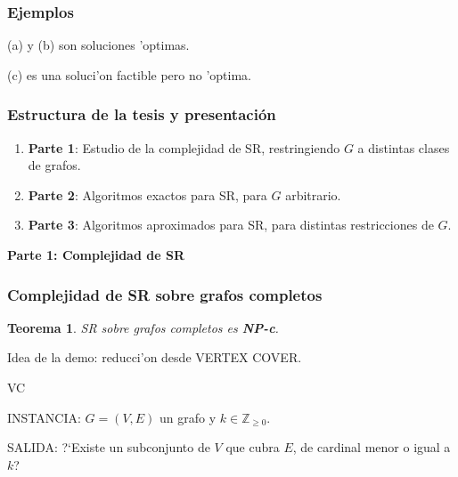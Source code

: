 \documentclass{beamer}
\newcommand{\class}[1]{\textnormal{\textbf{#1}}}
\newcommand{\probl}[1]{\textnormal{\textsf{#1}}}
\newtheorem*{thm}{Teorema}
\newcommand{\decpr}[3]{
\begin{list}{}{
\setlength{\leftmargin}{0.1in}
\setlength{\rightmargin}{0.1in}
\setlength{\parsep}{0pt}
\setlength{\itemsep}{2pt}
\setlength{\topsep}{\itemsep}
\setlength{\partopsep}{\itemsep}
}
\item
{\probl{#1}}
\item
{INSTANCIA: #2}
\item
{SALIDA: #3}
\end{list}
\vspace{1mm}
}
\begin{document}
\begin{frame}
\frametitle{Ejemplos}
\vspace{5mm}
\begin{figure}
	\begin{center}
		
	\end{center}	
\end{figure}
(a) y (b) son soluciones 'optimas.

(c) es una soluci'on factible pero no 'optima.
\end{frame}

\begin{frame}
\frametitle{Estructura de la tesis y presentaci\'on}

\pause

\begin{enumerate}
\item[] \textbf{Parte 1}: Estudio de la complejidad de \probl{SR}, restringiendo $G$ a distintas clases de grafos.
\vspace{2mm}
\pause
\item[] \textbf{Parte 2}: Algoritmos exactos para \probl{SR}, para $G$ arbitrario.
\vspace{2mm}
\pause
\item[] \textbf{Parte 3}: Algoritmos aproximados para \probl{SR}, para distintas restricciones de $G$.
\end{enumerate}
\end{frame}

\begin{frame}
\begin{center}
\begin{Large}
\textbf{Parte 1: Complejidad de \probl{SR}}
\end{Large}
\end{center}
\end{frame}

\begin{frame}
\frametitle{Complejidad de \probl{SR} sobre grafos completos}

\pause

\begin{thm}
\probl{SR} sobre grafos completos es \class{NP-c}.
\end{thm}

\pause
\vspace{3mm}

Idea de la demo: reducci'on desde \probl{VERTEX COVER}.\\

\pause
\vspace{3mm}

\decpr{VC}{$G = (V, E)$ un grafo y $k \in \mathbb{Z}_{\geq 0}$.}{?`Existe un subconjunto de $V$ que cubra $E$, de cardinal menor o igual a $k$?}

\end{frame}
\end{document}
